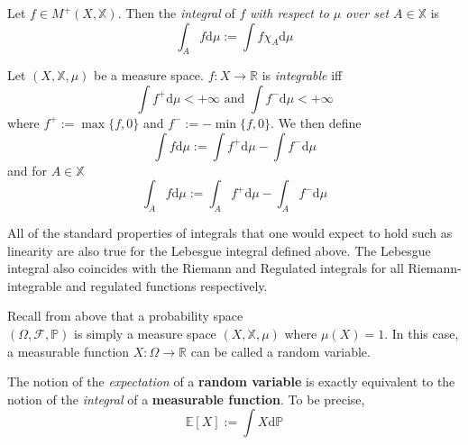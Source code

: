 \begin{definition}
    Let $f\in M^+(X,\mathbb{X})$. Then the \emph{integral} of $f$
    \emph{with respect to $\mu$ over set $A\in \mathbb{X}$} is
    \begin{equation}
        \int_A f\mathrm d\mu:=\int f\chi_A\mathrm d\mu
    \end{equation}
\end{definition}

\begin{definition}
    Let $(X,\mathbb{X},\mu)$ be a measure space. $f:X\rightarrow\mathbb{R}$
    is \emph{integrable} iff 
    \begin{equation}
        \int f^+\mathrm d\mu<+\infty \textrm{ and }\int f^-\mathrm d\mu<+\infty
    \end{equation}
    where $f^+:=\max\{f,0\}$ and $f^-:=-\min\{f,0\}$.
    We then define
    \begin{equation}
        \int f\mathrm d\mu:=\int f^+\mathrm d\mu -\int f^-\mathrm d\mu
    \end{equation}
    and for $A\in\mathbb{X}$
    \begin{equation}
        \int_A f\mathrm d\mu:=\int_A f^+\mathrm d\mu -\int_A f^-\mathrm d\mu
    \end{equation}
\end{definition}

\begin{remark}
    All of the standard properties of integrals that one would expect
    to hold such as linearity are also true for the Lebesgue integral 
    defined above. The Lebesgue integral also coincides with the Riemann
    and Regulated integrals for all Riemann-integrable and regulated functions respectively.
\end{remark}

\begin{definition}
    Recall from above that a probability space \\$(\Omega,\mathcal{F},\mathbb{P})$
    is simply a measure space $(X,\mathbb{X},\mu)$ where $\mu(X)=1.$ In this case,
    a measurable function $X:\Omega\rightarrow\mathbb{R}$ can be called
    a random variable. 
\end{definition}

\begin{definition}[Expectation]
    The notion of the \emph{expectation} of a \textbf{random variable} is exactly equivalent
    to the notion of the \emph{integral} of a \textbf{measurable function}.
    To be precise,
    \begin{equation}
        \mathbb{E}[X]:=\int X\mathrm d\mathbb{P}
    \end{equation}
\end{definition}

